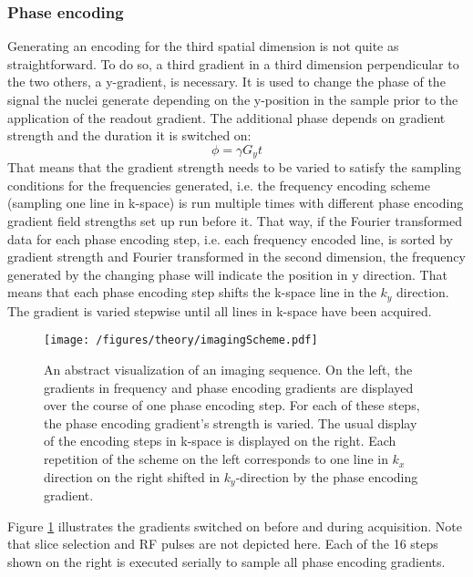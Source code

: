         \subsubsection{Phase encoding}
            Generating an encoding for the third spatial dimension is not quite as straightforward.  To do so, a third gradient in a third dimension perpendicular to the two others, a y-gradient, is necessary.  It is used to change the phase of the signal the nuclei generate depending on the y-position in the sample prior to the application of the readout gradient. The additional phase depends on gradient strength and the duration it is switched on:
            \begin{equation}
                \phi = \gamma G_y t
            \end{equation}
            That means that the gradient strength needs to be varied to satisfy the sampling conditions for the frequencies generated, i.e. the frequency encoding scheme (sampling one line in k-space) is run multiple times with different phase encoding gradient field strengths set up run before it. That way, if the Fourier transformed data for each phase encoding step, i.e. each frequency encoded line, is sorted by gradient strength and Fourier transformed in the second dimension, the frequency generated by the changing phase will indicate the position in y direction. That means that each phase encoding step shifts the k-space line in the $k_y$ direction. The gradient is varied stepwise until all lines in k-space have been acquired.
            \begin{figure}
                \texttt{[image: /figures/theory/imagingScheme.pdf]}
                \centering
                \caption[k-space Graph]{An abstract visualization of an imaging sequence. On the left, the gradients in frequency and phase encoding gradients are displayed over the course of one phase encoding step. For each of these steps, the phase encoding gradient's strength is varied. The usual display of the encoding steps in k-space is displayed on the right. Each repetition of the scheme on the left corresponds to one line in $k_x$ direction on the right shifted in $k_y$-direction by the phase encoding gradient.}
                \label{figure:theory:MRIScheme}
            \end{figure}
            Figure \ref{figure:theory:MRIScheme} illustrates the gradients switched on before and during acquisition. Note that slice selection and RF pulses are not depicted here. Each of the 16 steps shown on the right is executed serially to sample all phase encoding gradients.
